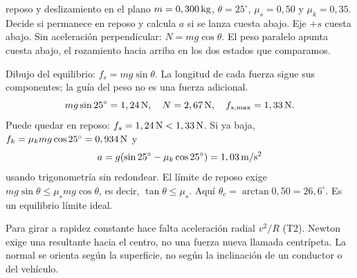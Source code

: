 \documentclass[11pt,a4paper]{article}
\begin{document}
\begin{examplebox}{reposo y deslizamiento en el plano}
 $m=0,300\,\mathrm{kg}$, $\theta=25^\circ$, $\mu_s=0,50$ y
$\mu_k=0,35$. Decide si permanece en reposo y calcula $a$ si se lanza cuesta abajo.
\solutionblock
{} Eje $+s$ cuesta abajo. Sin aceleraci\'on perpendicular:
$N=mg\cos\theta$. El peso paralelo apunta cuesta abajo, el rozamiento
hacia arriba en los dos estados que comparamos.
\begin{center}
\end{center}
Dibujo del equilibrio: $f_s=mg\sin\theta$. La longitud de cada fuerza sigue
sus componentes; la gu\'ia del peso no es una fuerza adicional.
\[
mg\sin25^\circ=1,24\,\mathrm{N},\quad N=2,67\,\mathrm{N},\quad f_{s,\max}=1,33\,\mathrm{N}.
\]
Puede quedar en reposo: $f_s=1,24\,\mathrm{N}<1,33\,\mathrm{N}$.
Si ya baja, $f_k=\mu_kmg\cos25^\circ=0,934\,\mathrm{N}$ y
\[
a=g(\sin25^\circ-\mu_k\cos25^\circ)=1,03\,\mathrm{m/s^2}
\]
usando trigonometr\'ia sin redondear.
 El l\'imite de reposo exige
$mg\sin\theta\le\mu_smg\cos\theta$, es decir, $\tan\theta\le\mu_s$.
Aqu\'i $\theta_c=\arctan0,50=26,6^\circ$. Es un equilibrio l\'imite ideal.
\end{examplebox}

Para girar a rapidez constante hace falta aceleraci\'on radial $v^2/R$
(T2). Newton exige una resultante hacia el centro, no una fuerza nueva llamada
centr\'ipeta. La normal se orienta seg\'un la superficie, no seg\'un la inclinaci\'on
de un conductor o del veh\'iculo.
\end{document}
